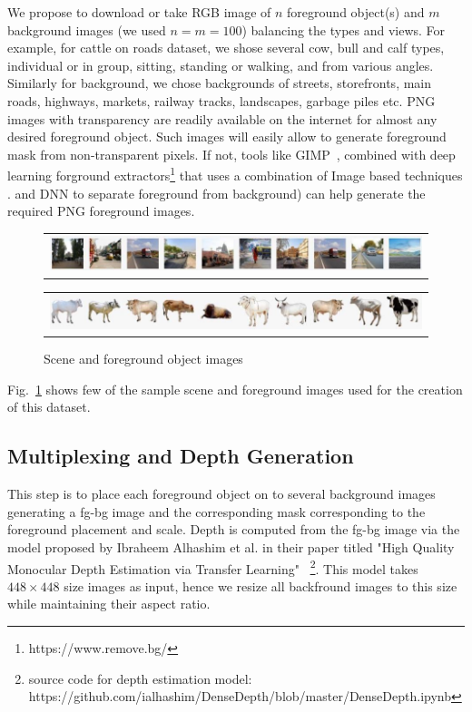 \documentclass[review]{cvpr}
\begin{document}
We propose to download or take RGB image of $n$ foreground object(s) and $m$ background images (we used $n=m=100$)
balancing the types and views. For example, for cattle on roads dataset, we shose several cow, bull and calf types, individual
 or in group, sitting, standing or walking, and from various angles. Similarly for background, we chose backgrounds of streets, 
 storefronts, main roads, highways, markets, railway tracks, landscapes, garbage piles etc.
PNG images with transparency are readily available on the internet for almost any desired foreground object.
Such images will easily allow to generate foreground mask from non-transparent pixels. 
If not, tools like GIMP~\cite{howat2014greenland}, combined with deep learning forground extractors\footnote{https://www.remove.bg/}
that uses a combination of Image based techniques .
and DNN to separate foreground from background) can help generate the required PNG foreground images.

\begin{figure}
  \begin{center}
  \begin{tabular}{@{}c@{}}
    \includegraphics[width=0.8\linewidth]{bgimages.jpg}
  \end{tabular}
  \begin{tabular}{@{}c@{}}
      \includegraphics[width=0.8\linewidth]{fgimages.jpg}
  \end{tabular}
  \end{center}
  \caption{Scene and foreground object images}
  \label{fig:sceneandfg}
\end{figure}

Fig.~\ref{fig:sceneandfg} shows few of the sample scene and foreground images used for the creation of this dataset. 

\subsection{Multiplexing and Depth Generation}

This step is to place each foreground object on to several background images generating a fg-bg image and the corresponding mask
corresponding to the foreground placement and scale. Depth is computed from the fg-bg image via the model proposed by 
Ibraheem Alhashim et al. in their paper titled "High Quality Monocular Depth Estimation via Transfer Learning"
~\cite{alhashim2018high}\footnote{source code for depth estimation model: https://github.com/ialhashim/DenseDepth/blob/master/DenseDepth.ipynb}. 
This model takes $448\times448$ size images as input, hence we resize all backfround images to this size while maintaining their aspect ratio.
\end{document}
